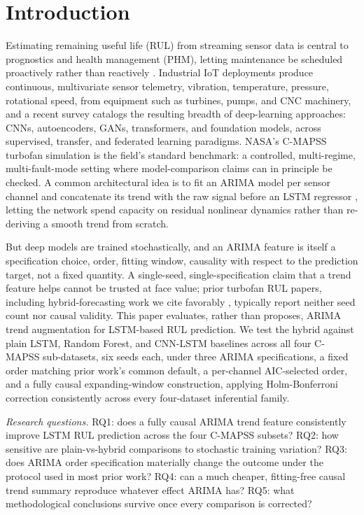 \documentclass[conference]{IEEEtran}
\begin{document}
\section{Introduction}
Estimating remaining useful life (RUL) from streaming sensor data is central to prognostics and health management (PHM), letting maintenance be scheduled proactively rather than reactively \cite{saxena2008}. Industrial IoT deployments produce continuous, multivariate sensor telemetry, vibration, temperature, pressure, rotational speed, from equipment such as turbines, pumps, and CNC machinery, and a recent survey \cite{survey2025} catalogs the resulting breadth of deep-learning approaches: CNNs, autoencoders, GANs, transformers, and foundation models, across supervised, transfer, and federated learning paradigms. NASA's C-MAPSS turbofan simulation \cite{saxena2008} is the field's standard benchmark: a controlled, multi-regime, multi-fault-mode setting where model-comparison claims can in principle be checked. A common architectural idea is to fit an ARIMA model per sensor channel and concatenate its trend with the raw signal before an LSTM regressor \cite{zhang2003}, letting the network spend capacity on residual nonlinear dynamics rather than re-deriving a smooth trend from scratch.

But deep models are trained stochastically, and an ARIMA feature is itself a specification choice, order, fitting window, causality with respect to the prediction target, not a fixed quantity. A single-seed, single-specification claim that a trend feature helps cannot be trusted at face value; prior turbofan RUL papers, including hybrid-forecasting work we cite favorably \cite{arimalstmvalve2022}, typically report neither seed count nor causal validity. This paper evaluates, rather than proposes, ARIMA trend augmentation for LSTM-based RUL prediction. We test the hybrid against plain LSTM, Random Forest, and CNN-LSTM baselines across all four C-MAPSS sub-datasets, six seeds each, under three ARIMA specifications, a fixed order matching prior work's common default, a per-channel AIC-selected order, and a fully causal expanding-window construction, applying Holm-Bonferroni correction consistently across every four-dataset inferential family.

\emph{Research questions.} RQ1: does a fully causal ARIMA trend feature consistently improve LSTM RUL prediction across the four C-MAPSS subsets? RQ2: how sensitive are plain-vs-hybrid comparisons to stochastic training variation? RQ3: does ARIMA order specification materially change the outcome under the protocol used in most prior work? RQ4: can a much cheaper, fitting-free causal trend summary reproduce whatever effect ARIMA has? RQ5: what methodological conclusions survive once every comparison is corrected?
\end{document}
